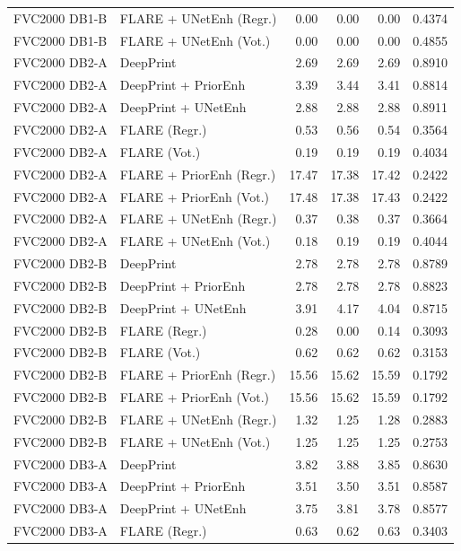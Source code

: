 {\begin{longtable}{llrrrr}
FVC2000 DB1-B & FLARE + UNetEnh (Regr.) & 0.00 & 0.00 & 0.00 & 0.4374 \\
FVC2000 DB1-B & FLARE + UNetEnh (Vot.) & 0.00 & 0.00 & 0.00 & 0.4855 \\
\midrule
FVC2000 DB2-A & DeepPrint & 2.69 & 2.69 & 2.69 & 0.8910 \\
FVC2000 DB2-A & DeepPrint + PriorEnh & 3.39 & 3.44 & 3.41 & 0.8814 \\
FVC2000 DB2-A & DeepPrint + UNetEnh & 2.88 & 2.88 & 2.88 & 0.8911 \\
FVC2000 DB2-A & FLARE (Regr.) & 0.53 & 0.56 & 0.54 & 0.3564 \\
FVC2000 DB2-A & FLARE (Vot.) & 0.19 & 0.19 & 0.19 & 0.4034 \\
FVC2000 DB2-A & FLARE + PriorEnh (Regr.) & 17.47 & 17.38 & 17.42 & 0.2422 \\
FVC2000 DB2-A & FLARE + PriorEnh (Vot.) & 17.48 & 17.38 & 17.43 & 0.2422 \\
FVC2000 DB2-A & FLARE + UNetEnh (Regr.) & 0.37 & 0.38 & 0.37 & 0.3664 \\
FVC2000 DB2-A & FLARE + UNetEnh (Vot.) & 0.18 & 0.19 & 0.19 & 0.4044 \\
\midrule
FVC2000 DB2-B & DeepPrint & 2.78 & 2.78 & 2.78 & 0.8789 \\
FVC2000 DB2-B & DeepPrint + PriorEnh & 2.78 & 2.78 & 2.78 & 0.8823 \\
FVC2000 DB2-B & DeepPrint + UNetEnh & 3.91 & 4.17 & 4.04 & 0.8715 \\
FVC2000 DB2-B & FLARE (Regr.) & 0.28 & 0.00 & 0.14 & 0.3093 \\
FVC2000 DB2-B & FLARE (Vot.) & 0.62 & 0.62 & 0.62 & 0.3153 \\
FVC2000 DB2-B & FLARE + PriorEnh (Regr.) & 15.56 & 15.62 & 15.59 & 0.1792 \\
FVC2000 DB2-B & FLARE + PriorEnh (Vot.) & 15.56 & 15.62 & 15.59 & 0.1792 \\
FVC2000 DB2-B & FLARE + UNetEnh (Regr.) & 1.32 & 1.25 & 1.28 & 0.2883 \\
FVC2000 DB2-B & FLARE + UNetEnh (Vot.) & 1.25 & 1.25 & 1.25 & 0.2753 \\
\midrule
FVC2000 DB3-A & DeepPrint & 3.82 & 3.88 & 3.85 & 0.8630 \\
FVC2000 DB3-A & DeepPrint + PriorEnh & 3.51 & 3.50 & 3.51 & 0.8587 \\
FVC2000 DB3-A & DeepPrint + UNetEnh & 3.75 & 3.81 & 3.78 & 0.8577 \\
FVC2000 DB3-A & FLARE (Regr.) & 0.63 & 0.62 & 0.63 & 0.3403 \\

\end{longtable}}
